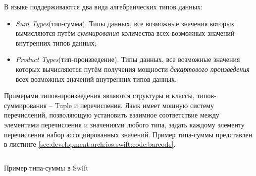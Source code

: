 В языке поддерживаются два вида алгебраических типов данных:

\begin{itemize}
	\item \emph{Sum Types}(тип-сумма). Типы данных, все возможные значения которых вычисляются путём \textit{суммирования} количества всех возможных значений внутренних типов данных;
	\item \emph{Product Types}(тип-произведение). Типы данных, все возможные значения которых вычисляются путём получения мощности \textit{декартового произведения} всех возможных значений внутренних типов данных.
\end{itemize}

Примерами типов-произведения являются структуры и классы, типов-суммирования -- Tuple и перечисления. Язык имеет мощную систему перечислений, позволяющую установить взаимное соответствие между элементами перечисления и значениями любого типа, задать каждому элементу перечисления набор ассоциированных значений. Пример типа-суммы представлен в листинге \ref{sec:development:arch:ios:swift:code:barcode}.

\begin{code}
	\inputminted{swift}{inc/src/swift_enum_sample.swift}
   \caption{Пример типа-суммы в Swift}
   \label{sec:development:arch:ios:swift:code:barcode}
\end{code}